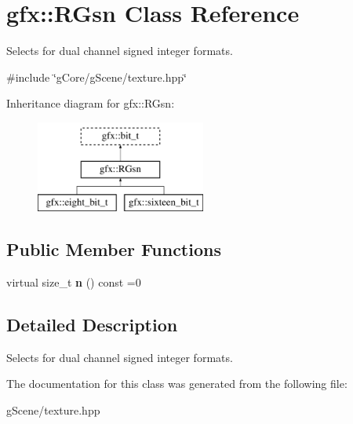 \hypertarget{classgfx_1_1RGsn}{\section{gfx\-:\-:R\-Gsn Class Reference}
\label{classgfx_1_1RGsn}
}


Selects for dual channel signed integer formats.  




{\ttfamily \#include \char`\"{}g\-Core/g\-Scene/texture.\-hpp\char`\"{}}

Inheritance diagram for gfx\-:\-:R\-Gsn\-:\begin{figure}[H]
\begin{center}
\leavevmode
\includegraphics[height=3.000000cm]{classgfx_1_1RGsn}
\end{center}
\end{figure}
\subsection*{Public Member Functions}
\begin{DoxyCompactItemize}
\item 
\hypertarget{classgfx_1_1RGsn_a37696bc2a0a48aaf43fa477d9563c1f0}{virtual size\-\_\-t {\bfseries n} () const =0}\label{classgfx_1_1RGsn_a37696bc2a0a48aaf43fa477d9563c1f0}

\end{DoxyCompactItemize}


\subsection{Detailed Description}
Selects for dual channel signed integer formats. 

The documentation for this class was generated from the following file\-:\begin{DoxyCompactItemize}
\item 
g\-Scene/texture.\-hpp\end{DoxyCompactItemize}
